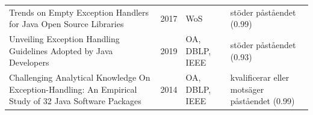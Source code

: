 \begin{longtable}{@{}%
  >{\raggedright\arraybackslash}p{}c%
  >{\raggedright\arraybackslash}p{}%
  >{\raggedright\arraybackslash}p{}@{}}
Trends on Empty Exception Handlers for Java Open Source Libraries & 2017 & WoS & stöder påståendet (0.99) \\
Unveiling Exception Handling Guidelines Adopted by Java Developers & 2019 & OA, DBLP, IEEE & stöder påståendet (0.93) \\
Challenging Analytical Knowledge On Exception-Handling: An Empirical Study of 32 Java Software Packages & 2014 & OA, DBLP, IEEE & kvalificerar eller motsäger påståendet (0.99) \\
\end{longtable}
\endgroup
